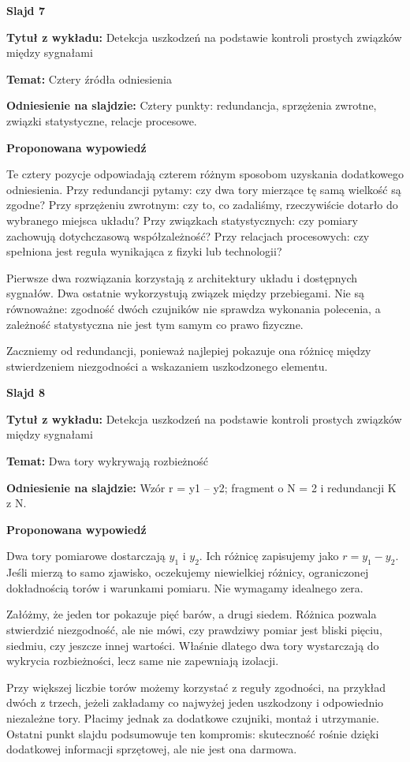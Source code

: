 \documentclass[a4paper,11pt]{article}
\newcommand{\NumerSlajdu}{1}
\newcommand{\Komentarz}[3]{%
  \gdef\NumerSlajdu{#1}%
  {\Large\bfseries Slajd #1\par}\smallskip
  \textbf{Tytuł z wykładu:} #2\par
  \textbf{Temat:} #3\par\medskip
}
\begin{document}
\Komentarz{7}{Detekcja uszkodzeń na podstawie kontroli prostych związków między sygnałami}{Cztery źródła odniesienia}
{\small\color{black!65}\textbf{Odniesienie na slajdzie:} Cztery punkty: redundancja, sprzężenia zwrotne, związki statystyczne, relacje procesowe.\par}
\medskip
\textbf{Proponowana wypowiedź}\par
Te cztery pozycje odpowiadają czterem różnym sposobom uzyskania dodatkowego odniesienia. Przy redundancji pytamy: czy dwa tory mierzące tę samą wielkość są zgodne? Przy sprzężeniu zwrotnym: czy to, co zadaliśmy, rzeczywiście dotarło do wybranego miejsca układu? Przy związkach statystycznych: czy pomiary zachowują dotychczasową współzależność? Przy relacjach procesowych: czy spełniona jest reguła wynikająca z fizyki lub technologii?

Pierwsze dwa rozwiązania korzystają z architektury układu i dostępnych sygnałów. Dwa ostatnie wykorzystują związek między przebiegami. Nie są równoważne: zgodność dwóch czujników nie sprawdza wykonania polecenia, a zależność statystyczna nie jest tym samym co prawo fizyczne.

Zaczniemy od redundancji, ponieważ najlepiej pokazuje ona różnicę między stwierdzeniem niezgodności a wskazaniem uszkodzonego elementu.
\clearpage

\Komentarz{8}{Detekcja uszkodzeń na podstawie kontroli prostych związków między sygnałami}{Dwa tory wykrywają rozbieżność}
{\small\color{black!65}\textbf{Odniesienie na slajdzie:} Wzór r = y1 -- y2; fragment o N = 2 i redundancji K z N.\par}
\medskip
\textbf{Proponowana wypowiedź}\par
Dwa tory pomiarowe dostarczają $y_1$ i $y_2$. Ich różnicę zapisujemy jako $r=y_1-y_2$. Jeśli mierzą to samo zjawisko, oczekujemy niewielkiej różnicy, ograniczonej dokładnością torów i warunkami pomiaru. Nie wymagamy idealnego zera.

Załóżmy, że jeden tor pokazuje pięć barów, a drugi siedem. Różnica pozwala stwierdzić niezgodność, ale nie mówi, czy prawdziwy pomiar jest bliski pięciu, siedmiu, czy jeszcze innej wartości. Właśnie dlatego dwa tory wystarczają do wykrycia rozbieżności, lecz same nie zapewniają izolacji.

Przy większej liczbie torów możemy korzystać z reguły zgodności, na przykład dwóch z trzech, jeżeli zakładamy co najwyżej jeden uszkodzony i odpowiednio niezależne tory. Płacimy jednak za dodatkowe czujniki, montaż i utrzymanie. Ostatni punkt slajdu podsumowuje ten kompromis: skuteczność rośnie dzięki dodatkowej informacji sprzętowej, ale nie jest ona darmowa.
\clearpage
\end{document}

